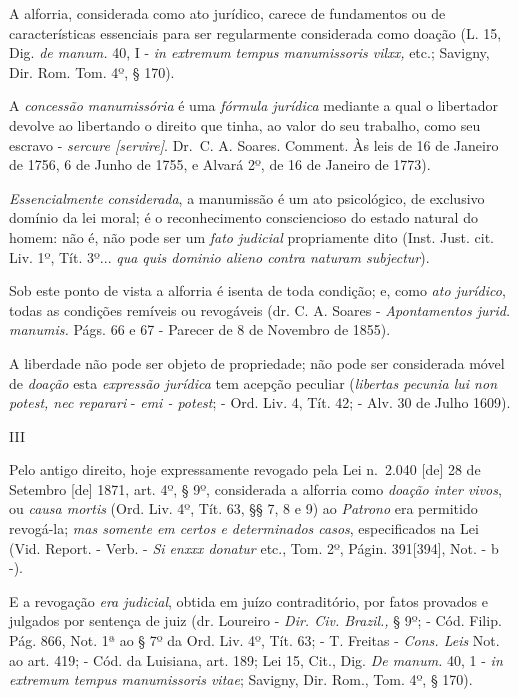 A alforria, considerada como ato jurídico, carece de fundamentos ou de
características essenciais para ser regularmente considerada como doação
(L. 15, Dig. \emph{de manum.} 40, I - \emph{in extremum tempus
manumissoris vilxx,} etc.; Savigny, Dir. Rom. Tom. 4º, § 170).

A \emph{concessão manumissória} é uma \emph{fórmula jurídica} mediante a
qual o libertador devolve ao libertando o direito que tinha, ao valor do
seu trabalho, como seu escravo - \emph{sercure {[}servire{]}}. Dr.~C. A.
Soares. Comment. Às leis de 16 de Janeiro de 1756, 6 de Junho de 1755, e
Alvará 2º, de 16 de Janeiro de 1773).

\emph{Essencialmente considerada}, a manumissão é um ato psicológico, de
exclusivo domínio da lei moral; é o reconhecimento consciencioso do
estado natural do homem: não é, não pode ser um \emph{fato judicial}
propriamente dito (Inst. Just. cit. Liv. 1º, Tít. 3º... \emph{qua quis
dominio alieno contra naturam subjectur}).

Sob este ponto de vista a alforria é isenta de toda condição; e, como
\emph{ato jurídico}, todas as condições remíveis ou revogáveis (dr. C.
A. Soares - \emph{Apontamentos jurid. manumis.} Págs. 66 e 67 - Parecer
de 8 de Novembro de 1855).

A liberdade não pode ser objeto de propriedade; não pode ser considerada
móvel de \emph{doação} esta \emph{expressão jurídica} tem acepção
peculiar (\emph{libertas pecunia lui non potest, nec reparari} -
\emph{emi - potest}; - Ord. Liv. 4, Tít. 42; - Alv. 30 de Julho 1609).

III

Pelo antigo direito, hoje expressamente revogado pela Lei n.~2.040
{[}de{]} 28 de Setembro {[}de{]} 1871, art. 4º, § 9º, considerada a
alforria como \emph{doação inter vivos}, ou \emph{causa mortis} (Ord.
Liv. 4º, Tít. 63, §§ 7, 8 e 9) ao \emph{Patrono} era permitido
revogá-la; \emph{mas somente em certos e determinados casos},
especificados na Lei (Vid. Report. - Verb. - \emph{Si enxxx donatur}
etc., Tom. 2º, Págin. 391{[}394{]}, Not. - b -).

E a revogação \emph{era judicial}, obtida em juízo contraditório, por
fatos provados e julgados por sentença de juiz (dr. Loureiro -
\emph{Dir. Civ. Brazil.,} § 9º; - Cód. Filip. Pág. 866, Not. 1ª ao § 7º
da Ord. Liv. 4º, Tít. 63; - T. Freitas - \emph{Cons. Leis} Not. ao art.
419; - Cód. da Luisiana, art. 189; Lei 15, Cit., Dig. \emph{De manum.}
40, 1 - \emph{in extremum tempus manumissoris vitae}; Savigny, Dir.
Rom., Tom. 4º, § 170).

